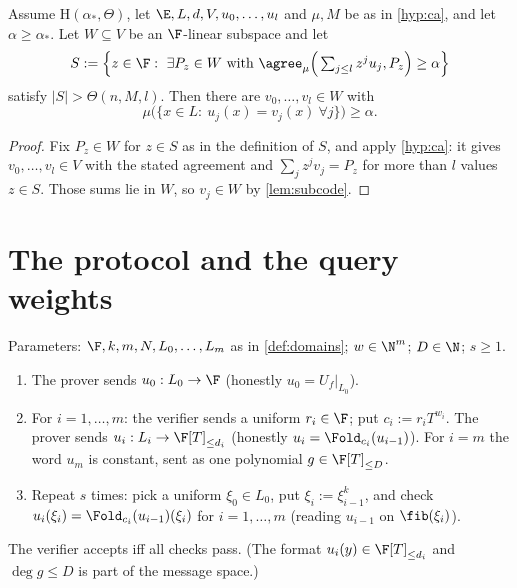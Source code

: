 {{\begin{consequence}\label{cor:share}
Assume $\mathrm H(\alpha_*,\Theta)$, let $\E,L,d,V,u_0,\dots,u_l$ and $\mu,M$ be as in
\ref{hyp:ca}, and let $\alpha\ge\alpha_*$. Let $W\subseteq V$ be an $\F$-linear subspace and let
\[
S:=\Big\{z\in\F:\ \exists P_z\in W\ \text{with}\ \agree_\mu\Big(\textstyle\sum_{j\le l}z^ju_j,P_z\Big)\ge\alpha\Big\}
\]
satisfy $|S|>\Theta(n,M,l)$. Then there are $v_0,\dots,v_l\in W$ with
\[
\mu\big(\{x\in L:\ u_j(x)=v_j(x)\ \forall j\}\big)\ge\alpha .
\]
\end{consequence}

\begin{proof}
Fix $P_z\in W$ for $z\in S$ as in the definition of $S$, and apply \ref{hyp:ca}: it gives
$v_0,\dots,v_l\in V$ with the stated agreement and $\sum_jz^jv_j=P_z$ for more than $l$ values
$z\in S$. Those sums lie in $W$, so $v_j\in W$ by \ref{lem:subcode}.
\end{proof}

\section{The protocol and the query weights}

\begin{definition}\label{def:protocol}\leanok{}
Parameters: $\F,k,m,N,L_0,\dots,L_m$ as in \ref{def:domains}; $w\in\N^m$; $D\in\N$;
$s\ge1$.
\begin{enumerate}
\item The prover sends $u_0:L_0\to\F$ (honestly $u_0=U_f|_{L_0}$).
\item For $i=1,\dots,m$: the verifier sends a uniform $r_i\in\F$; put $c_i:=r_iT^{w_i}$.
The prover sends $u_i:L_i\to\F[T]_{\le d_i}$ (honestly $u_i=\Fold_{c_i}(u_{i-1})$).
For $i=m$ the word $u_m$ is constant, sent as one polynomial $g\in\F[T]_{\le D}$.
\item Repeat $s$ times: pick a uniform $\xi_0\in L_0$, put $\xi_i:=\xi_{i-1}^k$, and check
$u_i(\xi_i)=\Fold_{c_i}(u_{i-1})(\xi_i)$ for $i=1,\dots,m$ (reading $u_{i-1}$ on
$\fib(\xi_i)$).
\end{enumerate}
The verifier accepts iff all checks pass. (The format $u_i(y)\in\F[T]_{\le d_i}$ and
$\deg g\le D$ is part of the message space.)
\end{definition}

}}
